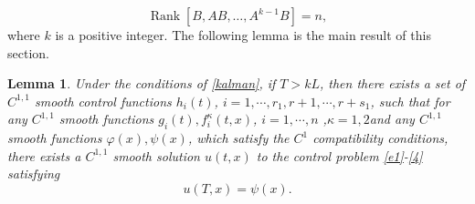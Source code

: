 \documentclass[a4paper,reqno,11pt]{amsart}
\numberwithin{equation}{section} %
\newtheorem{lem}{Lemma}[section]
\begin{document}
\begin{equation}\label{kalman}
	\operatorname{Rank}\left[B, AB, \ldots, A^{k-1} B\right]=n,
\end{equation}
where $k$ is a positive integer. The following lemma is the main result of this section.
\begin{lem}\label{lem:linear}
Under the conditions of \eqref{kalman}, if $T>kL$, then there exists a set of $C^{1,1}$ smooth control functions $h_i(t)$, $i=1,\cdots ,r_1, r+1,\cdots ,r+s_1$, such that for any $C^{1,1}$ smooth functions $g_i(t), f^{\kappa}_i(t,x)$, $i=1,\cdots ,n$ ,$\kappa=1,2$and any $C^{1,1}$ smooth functions $\varphi (x), \psi (x)$, which satisfy the $C^1$ compatibility conditions, there exists a $C^{1,1}$ smooth solution $u(t,x)$ to the control problem \eqref{e1}-\eqref{4} satisfying
	\begin{equation}\label{5}
        u(T,x)=\psi(x).
    \end{equation}
\end{lem}
\end{document}
